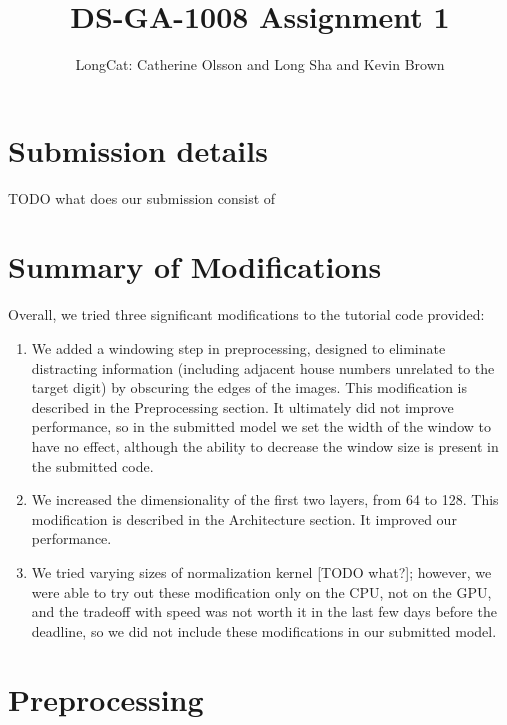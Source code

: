 \documentclass{article}
\title{DS-GA-1008 Assignment 1}
\author{LongCat: Catherine Olsson and Long Sha and Kevin Brown}
\begin{document}
 \maketitle


\section{Submission details}

TODO what does our submission consist of

\section{Summary of Modifications}

Overall, we tried three significant modifications to the tutorial code
provided:

\begin{enumerate}
\item We added a windowing step in preprocessing, designed to eliminate distracting information (including adjacent house numbers unrelated to the target digit) by obscuring the edges of the images. This modification is described in the Preprocessing section. It ultimately did not improve performance, so in the submitted model we set the width of the window to have no effect, although the ability to decrease the window size is present in the submitted code.

\item We increased the dimensionality of the first two layers, from 64 to 128. This modification is described in the Architecture section. It improved our performance.

\item We tried varying sizes of normalization kernel [TODO what?]; however, we were able to try out these modification only on the CPU, not on the GPU, and the tradeoff with speed was not worth it in the last few days before the deadline, so we did not include these modifications in our submitted model.
\end{enumerate}

\section{Preprocessing}
\end{document}
